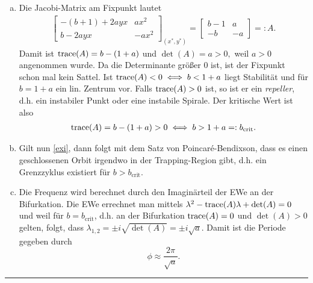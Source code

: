 \documentclass[11pt,a4paper]{article}
\begin{document}
\begin{loes}
\begin{enumerate}[a)]
\begin {figure}[!h]
 \end {figure}
\item Die Jacobi-Matrix am Fixpunkt lautet\begin{align*} \begin{bmatrix} -(b+1) + 2ayx & ax^2 \\ b-2ayx & -ax^2 \end{bmatrix}_{(x^*,y^*)} = \begin{bmatrix} b-1 & a \\ -b &  -a\end{bmatrix} =: A. \end{align*}
Damit ist $\operatorname{trace}(A) = b-(1+a)$ und $\det(A) = a > 0,$ weil $a > 0$ angenommen wurde. Da die Determinante gr\"o\ss er 0 ist, ist der Fixpunkt schon mal kein Sattel. Ist $\operatorname{trace}(A) < 0 \iff b < 1+a$ liegt Stabilit\"at  und f\"ur $b = 1+a$ ein lin. Zentrum vor. Falls $\operatorname{trace}(A) > 0$ ist, so ist er ein \emph{repeller}, d.h. ein instabiler Punkt oder eine instabile Spirale. Der kritische Wert ist also \begin{align}\label{exi} \operatorname{trace}(A) = b-(1+a) > 0 \iff b > 1+a =: b_{\mathrm{crit}}.\end{align}
\item Gilt nun \eqref{exi}, dann folgt mit dem Satz von Poincar\'e-Bendixson, dass es einen geschlossenen Orbit irgendwo in der Trapping-Region gibt, d.h. ein Grenzzyklus existiert f\"ur $b > b_{\mathrm{crit}}.$
\item Die Frequenz wird berechnet durch den Imagin\"arteil der EWe an der Bifurkation. Die EWe errechnet man mittels $\lambda^2 - \operatorname{trace}(A)\lambda + \det(A) = 0$ und weil f\"ur $b = b_{\mathrm{crit}}$, d.h. an der Bifurkation $\operatorname{trace}(A) = 0$ und $\det(A) > 0$ gelten, folgt, dass $\lambda_{1,2} =\pm i\sqrt{\det(A)} = \pm i \sqrt{a}. $ Damit ist die Periode gegeben durch \begin{equation*} \phi \approx \frac{2\pi}{\sqrt{a}}. \end{equation*}
\end{enumerate}
\end{loes}

\bigskip
\hrule
\begin{flushright}
\end{flushright}

\end{document}
